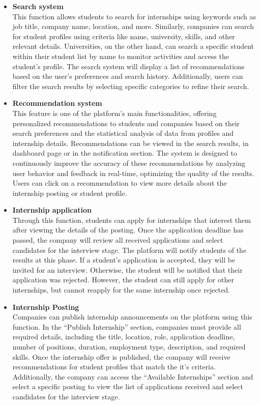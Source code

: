 \begin{itemize}[label={ }]
    \item \textcolor{bluepoli}{\textbf{Search system}}
    \\This function allows students to search for internships using keywords such as job title, company name, location, and more. Similarly, companies 
    can search for student profiles using criteria like name, university, skills, and other relevant details. Universities, on the other hand, can 
    search a specific student within their student list by name to monitor activities and access the student's profile.
    The search system will display a list of recommendations based on the user's preferences and search history. Additionally, users can filter the
    search results by selecting specific categories to refine their search.

    \item \textcolor{bluepoli}{\textbf{Recommendation system}} 
    \\This feature is one of the platform's main functionalities, offering personalized recommendations to students and companies based on their search
    preferences and the statistical analysis of data from profiles and internship details. Recommendations can be viewed in the search results, in
    dashboard page or in the notification section.
    The system is designed to continuously improve the accuracy of these recommendations by analyzing user behavior and feedback in real-time, 
    optimizing the quality of the results. Users can click on a recommendation to view more details about the internship posting or student profile.

    \item \textcolor{bluepoli}{\textbf{Internship application}}
    \\Through this function, students can apply for internships that interest them after viewing the details of the posting. Once the application deadline
    has passed, the company will review all received applications and select candidates for the interview stage. The platform will notify students of 
    the results at this phase. 
    If a student's application is accepted, they will be invited for an interview. Otherwise, the student will be notified that their application was rejected.
    However, the student can still apply for other internships, but cannot reapply for the same internship once rejected.

    \item \textcolor{bluepoli}{\textbf{Internship Posting}}
    \\Companies can publish internship announcements on the platform using this function. In the ``Publish Internship'' section, companies must provide all required
    details, including the title, location, role, application deadline, number of positions, duration, employment type, description, and required skills.
    Once the internship offer is published, the company will receive recommendations for student profiles that match the it's criteria. Additionally, 
    the company can access the ``Available Internships'' section and select a specific posting to view the list of applications received and select 
    candidates for the interview stage.


\end{itemize}
